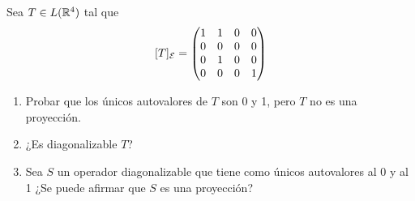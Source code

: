 \item Sea $T\in L(\mathbb{R}^4)$ tal que\[[T]_{\mathcal{E}}=\begin{pmatrix}
        1&1&0&0\\0&0&0&0\\0&1&0&0\\0&0&0&1
    \end{pmatrix}\]
    \begin{enumerate}
        \item Probar que los únicos autovalores de $T$ son 0 y 1, pero $T$ no es una proyección.
            \begin{mdframed}[style=s]
                
            \end{mdframed}
        \item ¿Es diagonalizable $T$?
            \begin{mdframed}[style=s]
                
            \end{mdframed}
        \item Sea $S$ un operador diagonalizable que tiene como únicos autovalores al 0 y al 1 ¿Se puede afirmar que $S$ es una proyección?
            \begin{mdframed}[style=s]
                
            \end{mdframed}
    \end{enumerate}